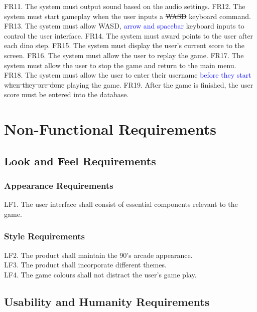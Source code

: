 \documentclass[12pt]{article}
\begin{document}
FR11. The system must output sound based on the audio settings. \newline
FR12. The system must start gameplay when the user inputs a \sout{WASD} keyboard command. \newline
FR13. The system must allow WASD, \textcolor{blue}{arrow and spacebar} keyboard inputs to control the user interface.\newline
FR14. The system must award points to the user after each dino step. \newline
FR15. The system must display the user’s current score to the screen. \newline
FR16. The system must allow the user to replay the game. \newline
FR17. The system must allow the user to stop the game and return to the main menu. \newline
FR18. The system must allow the user to enter their username \textcolor{blue}{before they start} \sout{when they are done} playing the game. \newline
FR19. After the game is finished, the user score must be entered into the database. \newline



\section{Non-Functional Requirements}
    \subsection{Look and Feel Requirements}
        \subsubsection{Appearance Requirements}
        LF1. The user interface shall consist of essential components relevant to the game.
        \subsubsection{Style Requirements} 
    	LF2. The product shall maintain the 90's arcade appearance.\\
    	LF3. The product shall incorporate different themes.\\
    	LF4. The game colours shall not distract the user's game play.
   
\subsection{Usability and Humanity Requirements}
\end{document}

